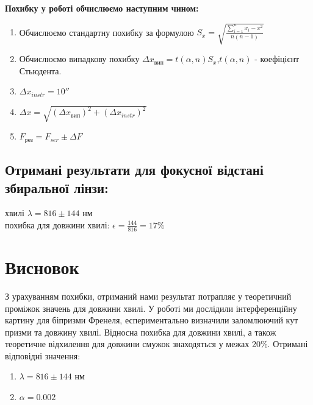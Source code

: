 
\begin{center}
  \textbf{Похибку у роботі обчислюємо наступним чином:}
\end{center}
\begin{enumerate}
  \item Обчислюємо стандартну похибку за формулою $S_x = \sqrt{\frac{\sum\limits_{i=1}^n{x_i - x}^2}{n(n-1)}}$
  \item Обчислюємо випадкову похибку $\Delta x_{вип} = t(\alpha , n) S_x$,$t(\alpha, n )$ - коефіцієнт Стьюдента.
  \item $\Delta x_{instr} = 10''$
  \item {$\Delta x = \sqrt{(\Delta x_{вип})^2 + (\Delta x_{instr})^2}$}
  \item $F_{рез} = F_{ser} \pm \Delta F$
\end{enumerate}
\subsection{Отримані результати для фокусної відстані збиральної лінзи:}
 хвилі $\lambda = 816 \pm 144$ нм \\
 похибка для довжини хвилі: $\epsilon = \frac{144}{816} = 17\%$
\section{Висновок}
\setlength{\parindent}{4em}
\qquad З урахуванням похибки, отриманий нами результат потрапляє у теоретичний проміжок значень для довжини хвилі. У роботі ми дослідили інтерференційну картину для біпризми Френеля, еспериментально визначили заломлюючий кут призми та довжину хвилі. Відносна похибка для довжини хвилі, а також теоретичне відхилення для довжини смужок знаходяться у межах 20\%. Отримані відповідні значення:
\begin{enumerate}
  \item $\lambda = 816 \pm 144$ нм
  \item $\alpha = 0.002$
\end{enumerate}
